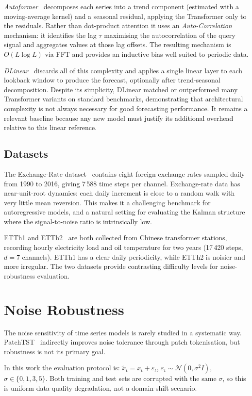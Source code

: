 \emph{Autoformer}~\cite{wu2021autoformer} decomposes each series into a
trend component (estimated with a moving-average kernel) and a seasonal
residual, applying the Transformer only to the residuals. Rather than
dot-product attention it uses an \emph{Auto-Correlation} mechanism: it
identifies the lag $\tau$ maximising the autocorrelation of the query
signal and aggregates values at those lag offsets. The resulting mechanism
is $O(L \log L)$ via FFT and provides an inductive bias well suited to periodic
data.

\emph{DLinear}~\cite{zeng2023transformers} discards all of this complexity
and applies a single linear layer to each lookback window to produce the
forecast, optionally after trend-seasonal decomposition. Despite its
simplicity, DLinear matched or outperformed many Transformer variants on
standard benchmarks, demonstrating that architectural complexity is not
always necessary for good forecasting performance. It remains a relevant
baseline because any new model must justify its additional overhead relative
to this linear reference.

\subsection{Datasets}
\label{sec:datasets}

The Exchange-Rate dataset~\cite{lai2018modeling} contains eight foreign exchange
rates sampled daily from 1990 to 2016, giving 7\,588 time steps per channel.
Exchange-rate data has near-unit-root dynamics: each daily increment is
close to a random walk with very little mean reversion. This makes it a
challenging benchmark for autoregressive models, and a natural setting
for evaluating the Kalman structure where the signal-to-noise ratio is
intrinsically low.

ETTh1 and ETTh2~\cite{zhou2021informer} are both collected from
Chinese transformer stations, recording hourly electricity load and oil
temperature for two years (17\,420 steps, $d=7$ channels). ETTh1 has a
clear daily periodicity, while ETTh2 is noisier and more irregular. The two
datasets provide contrasting difficulty levels for noise-robustness
evaluation.

\section{Noise Robustness}
\label{sec:robustness}

The noise sensitivity of time series models is rarely studied in
a systematic way. PatchTST~\cite{nie2022patchtst} indirectly improves noise
tolerance through patch tokenisation, but robustness is not its primary goal.

In this work the evaluation protocol is:
$\tilde{x}_t = x_t + \varepsilon_t$,
$\varepsilon_t \sim \mathcal{N}(0, \sigma^2 I)$, $\sigma \in \{0, 1, 3, 5\}$.
Both training and test sets are corrupted with the same $\sigma$, so this
is uniform data-quality degradation, not a domain-shift scenario.
